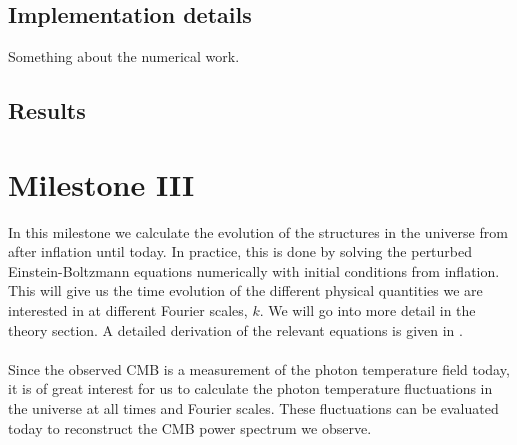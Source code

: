 \documentclass{aa}
\begin{document}
\subsection{Implementation details}
Something about the numerical work.

\subsection{Results}




\section{Milestone III}
In this milestone we calculate the evolution of the structures in the universe from after inflation until today.  In practice, this is done by 
solving the perturbed Einstein-Boltzmann equations numerically with initial conditions from inflation. This will give us the time evolution of the different physical quantities we are interested
in at different Fourier scales, $k$. We will go into more detail in the theory section. A detailed derivation of the relevant equations is given in \cite{winther:2023}. \\
\\
Since the observed CMB is a measurement of the photon temperature field today, it is of great interest for us to calculate the photon temperature fluctuations 
in the universe at all times and Fourier scales. These fluctuations can be evaluated today to reconstruct the CMB power spectrum we observe. 
\end{document}
